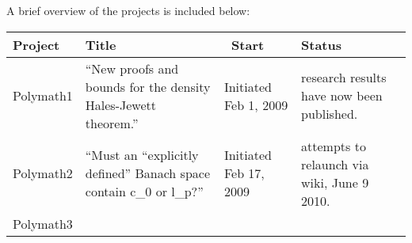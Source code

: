 \documentclass[article, floatfix, groupaddress, prb]{revtex4-1}
\begin{document}
A brief overview of the projects is included below:

\begin{longtable}[c]{@{}llll@{}}
\toprule
\begin{minipage}[b]{0.11\columnwidth}\raggedright\strut
Project
\strut\end{minipage} &
\begin{minipage}[b]{0.10\columnwidth}\raggedright\strut
Title
\strut\end{minipage} &
\begin{minipage}[b]{0.09\columnwidth}\raggedright\strut
~Start
\strut\end{minipage} &
\begin{minipage}[b]{0.09\columnwidth}\raggedright\strut
Status
\strut\end{minipage}\tabularnewline
\midrule
\endhead
\begin{minipage}[t]{0.11\columnwidth}\raggedright\strut
Polymath1
\strut\end{minipage} &
\begin{minipage}[t]{0.10\columnwidth}\raggedright\strut
``New proofs and bounds for the density Hales-Jewett theorem.''
\strut\end{minipage} &
\begin{minipage}[t]{0.09\columnwidth}\raggedright\strut
Initiated Feb 1, 2009
\strut\end{minipage} &
\begin{minipage}[t]{0.09\columnwidth}\raggedright\strut
research results have now been published.
\strut\end{minipage}\tabularnewline
\begin{minipage}[t]{0.11\columnwidth}\raggedright\strut
Polymath2
\strut\end{minipage} &
\begin{minipage}[t]{0.10\columnwidth}\raggedright\strut
``Must an ``explicitly defined'' Banach space contain c\_0 or l\_p?''
\strut\end{minipage} &
\begin{minipage}[t]{0.09\columnwidth}\raggedright\strut
Initiated Feb 17, 2009
\strut\end{minipage} &
\begin{minipage}[t]{0.09\columnwidth}\raggedright\strut
attempts to relaunch via wiki, June 9 2010.
\strut\end{minipage}\tabularnewline
\begin{minipage}[t]{0.11\columnwidth}\raggedright\strut
Polymath3
\strut\end{minipage} &

\end{longtable}
\end{document}
